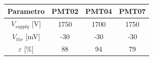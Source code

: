 \begin{tabular}{cccc}
\toprule
Parametro & PMT02 & PMT04 & PMT07 \\
\midrule
$V_{supply}$ [V] & 1750 & 1700 & 1750 \\
$V_{thr}$ [mV] & -30 & -30 & -30 \\
$\varepsilon$ [$\%$] & 88 & 94 & 79 \\
\bottomrule
\end{tabular}